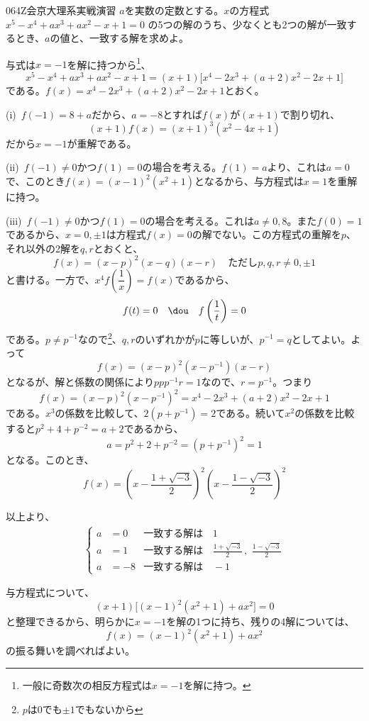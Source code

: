 \begin{thm}{064}{}{Z会京大理系実戦演習}
 $a$を実数の定数とする。$x$の方程式 $x^5-x^4+ax^3+ax^2-x+1=0$ の5つの解のうち、少なくとも2つの解が一致するとき、$a$の値と、一致する解を求めよ。
\end{thm}


与式は$x=-1$を解に持つから\footnote{一般に奇数次の相反方程式は$x=-1$を解に持つ。}、
\[ x^5-x^4+ax^3+ax^2-x+1=(x+1)\bigl[x^4-2x^3+(a+2)x^2-2x+1\bigr] \]
である。$f(x)=x^4-2x^3+(a+2)x^2-2x+1$とおく。

(i)~$f(-1)=8+a$だから、$a=-8$とすれば$f(x)$が$(x+1)$で割り切れ、
\[ (x+1)f(x)=(x+1)^3(x^2-4x+1) \]
だから$x=-1$が重解である。

(ii)~$f(-1)\neq 0$かつ$f(1)=0$の場合を考える。$f(1)=a$より、これは$a=0$で、このとき$f(x)=(x-1)^2(x^2+1)$となるから、与方程式は$x=1$を重解に持つ。

(iii)~$f(-1)\neq 0$かつ$f(1)=0$の場合を考える。これは$a\neq 0, 8$。また$f(0)=1$であるから、$x=0, \pm 1$は方程式$f(x)=0$の解でない。この方程式の重解を$p$、それ以外の2解を$q, r$とおくと、
\[ f(x)=(x-p)^2(x-q)(x-r) \quad \text{ただし$p, q, r\neq 0, \pm 1$} \]
と書ける。一方で、$x^4f\left(\dfrac{1}{x}\right)=f(x)$であるから、
\[ f(t)=0 \quad\dou\quad f\left(\frac{1}{t}\right)=0 \]
である。$p\neq p^{-1}$なので\footnote{$p$は$0$でも$\pm 1$でもないから}、$q, r$のいずれかが$p$に等しいが、$p^{-1}=q$としてよい。よって
\[ f(x)=(x-p)^2(x-p^{-1})(x-r) \]
となるが、解と係数の関係により$ppp^{-1}r=1$なので、$r=p^{-1}$。つまり
\[ f(x)=(x-p)^2(x-p^{-1})^2=x^4-2x^3+(a+2)x^2-2x+1 \]
である。$x^3$の係数を比較して、$2(p+p^{-1})=2$である。続いて$x^2$の係数を比較すると$p^2+4+p^{-2}=a+2$であるから、
\[ a=p^2+2+p^{-2}=(p+p^{-1})^2=1 \]
となる。このとき、
\[ f(x)=\left(x-\frac{1+\sqrt{-3}}{2}\right)^2\left(x-\frac{1-\sqrt{-3}}{2}\right)^2 \]

以上より、
\begin{align*}
 \left\{
 \begin{aligned}
  a&=0 & \text{一致する解は}&\, 1 \\
  a&=1 & \text{一致する解は}&\, \frac{1+\sqrt{-3}}{2}\,,\,\, \frac{1-\sqrt{-3}}{2} \\
  a&=-8 & \text{一致する解は}&\, -1
 \end{aligned}
 \right.
\end{align*}


与方程式について、
\[ (x+1)\bigl[(x-1)^2(x^2+1)+ax^2\bigr]=0 \]
と整理できるから、明らかに$x=-1$を解の1つに持ち、残りの4解については、
\[ f(x)=(x-1)^2(x^2+1)+ax^2 \]
の振る舞いを調べればよい。

